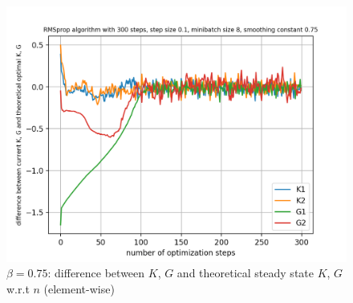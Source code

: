 \documentclass{article}
\begin{document}
\begin{figure}[h!]
\begin{minipage}[t]{.28\paperwidth}
		\includegraphics[width=1.0\textwidth]{Figures/d_beta_0_75_sep.png}
		\caption{$\beta = 0.75$: difference between $K$, $G$ and theoretical steady state $K$, $G$ w.r.t $n$ (element-wise)}
	\end{minipage}
\end{figure}
\end{document}
